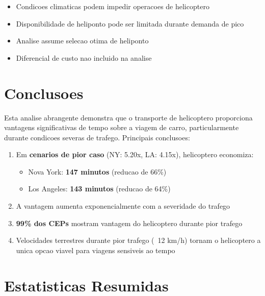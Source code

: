 \documentclass[12pt,a4paper]{article}
\begin{document}
\begin{itemize}
    \item Condicoes climaticas podem impedir operacoes de helicoptero
    \item Disponibilidade de heliponto pode ser limitada durante demanda de pico
    \item Analise assume selecao otima de heliponto
    \item Diferencial de custo nao incluido na analise
\end{itemize}

\section{Conclusoes}

Esta analise abrangente demonstra que o transporte de helicoptero proporciona vantagens significativas de tempo sobre a viagem de carro, particularmente durante condicoes severas de trafego. Principais conclusoes:

\begin{enumerate}
    \item Em \textbf{cenarios de pior caso} (NY: 5.20x, LA: 4.15x), helicoptero economiza:
    \begin{itemize}
        \item Nova York: \textbf{147 minutos} (reducao de 66\%)
        \item Los Angeles: \textbf{143 minutos} (reducao de 64\%)
    \end{itemize}
    
    \item A vantagem aumenta exponencialmente com a severidade do trafego
    
    \item \textbf{99\% dos CEPs} mostram vantagem do helicoptero durante pior trafego
    
    \item Velocidades terrestres durante pior trafego (~12 km/h) tornam o helicoptero a unica opcao viavel para viagens sensiveis ao tempo
\end{enumerate}

\section{Estatisticas Resumidas}
\end{document}

